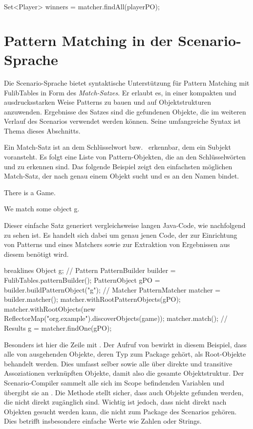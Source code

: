 \begin{jcodeblock}
    Set<Player> winners = matcher.findAll(playerPO);
\end{jcodeblock}

\section{Pattern Matching in der Scenario-Sprache}\label{sec:scenario-pattern-matching}

Die Scenario-Sprache bietet syntaktische Unterstützung für Pattern Matching mit FulibTables in Form des \emph{Match-Satzes}.
Er erlaubt es, in einer kompakten und ausdrucksstarken Weise Patterns zu bauen und auf Objektstrukturen anzuwenden.
Ergebnisse des Satzes sind die gefundenen Objekte, die im weiteren Verlauf des Scenarios verwendet werden können.
Seine umfangreiche Syntax ist Thema dieses Abschnitts.

Ein Match-Satz ist an dem Schlüsselwort  bzw.\  erkennbar, dem ein Subjekt voransteht.
Es folgt eine Liste von Pattern-Objekten, die an den Schlüsselwörten  und  zu erkennen sind.
Das folgende Beispiel zeigt den einfachsten möglichen Match-Satz, der nach genau einem Objekt sucht und es an den Namen  bindet.

\begin{mdcodeblock}
    There is a Game.

    We match some object g.
\end{mdcodeblock}

Dieser einfache Satz generiert vergleichsweise langen Java-Code, wie nachfolgend zu sehen ist.
Es handelt sich dabei um genau jenen Code, der zur Einrichtung von Patterns und eines Matchers sowie zur Extraktion von Ergebnissen aus diesem benötigt wird.

\begin{jcodeblock*}{breaklines}
    Object g;
    {
        // Pattern
        PatternBuilder builder = FulibTables.patternBuilder();
        PatternObject gPO = builder.buildPatternObject("g");
        // Matcher
        PatternMatcher matcher = builder.matcher();
        matcher.withRootPatternObjects(gPO);
        matcher.withRootObjects(new ReflectorMap("org.example").discoverObjects(game));
        matcher.match();
        // Results
        g = matcher.findOne(gPO);
    }
\end{jcodeblock*}

Besonders ist hier die Zeile mit .
Der Aufruf von  bewirkt in diesem Beispiel, dass alle von  ausgehenden Objekte, deren Typ zum Package  gehört, als Root-Objekte behandelt werden.
Dies umfasst  selber sowie alle über direkte und transitive Assoziationen verknüpften Objekte, damit also die gesamte Objektstruktur.
Der Scenario-Compiler sammelt alle sich im Scope befindenden Variablen und übergibt sie an .
Die Methode stellt sicher, dass auch Objekte gefunden werden, die nicht direkt zugänglich sind.
Wichtig ist jedoch, dass nicht direkt nach Objekten gesucht werden kann, die nicht zum Package des Scenarios gehören.
Dies betrifft insbesondere einfache Werte wie Zahlen oder Strings.

